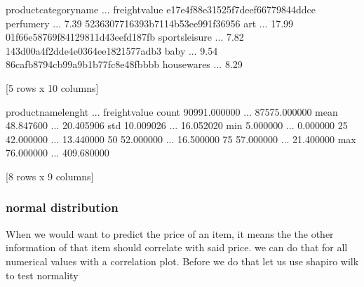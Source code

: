 \documentclass[letterpaper,10pt,english]{jupyterBook}
\begin{document}
\begin{sphinxVerbatim}[commandchars=\\\{\}]
                                 product\PYGZus{}category\PYGZus{}name  ...  freight\PYGZus{}value
e17e4f88e31525f7deef66779844ddce             perfumery  ...           7.39
5236307716393b7114b53ee991f36956                   art  ...          17.99
01f66e58769f84129811d43eefd187fb        sports\PYGZus{}leisure  ...           7.82
143d00a4f2dde4e0364ee1821577adb3                  baby  ...           9.54
86cafb8794cb99a9b1b77fc8e48fbbbb            housewares  ...           8.29

[5 rows x 10 columns]
\end{sphinxVerbatim}

\begin{sphinxVerbatim}[commandchars=\\\{\}]
\end{sphinxVerbatim}

\begin{sphinxVerbatim}[commandchars=\\\{\}]
       product\PYGZus{}name\PYGZus{}lenght  ...  freight\PYGZus{}value
count         90991.000000  ...   87575.000000
mean             48.847600  ...      20.405906
std              10.009026  ...      16.052020
min               5.000000  ...       0.000000
25\PYGZpc{}              42.000000  ...      13.440000
50\PYGZpc{}              52.000000  ...      16.500000
75\PYGZpc{}              57.000000  ...      21.400000
max              76.000000  ...     409.680000

[8 rows x 9 columns]
\end{sphinxVerbatim}


\subsubsection{normal distribution}
\label{\detokenize{c7_case_studies/Olist:normal-distribution}}
\sphinxAtStartPar
When we would want to predict the price of an item, it means the the other information of that item should correlate with said price. we can do that for all numerical values with a correlation plot. Before we do that let us use shapiro wilk to test normality

\begin{sphinxVerbatim}[commandchars=\\\{\}]
    \PYG{p}{[}  \PYG{p}{]}
\end{sphinxVerbatim}
\end{document}
